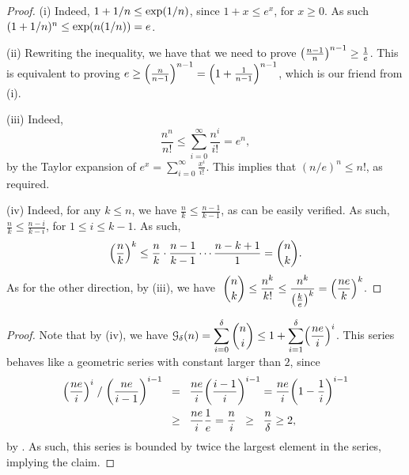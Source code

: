 \begin{proof}
    (i) Indeed, $1+1/n\leq \exp \pth{1/n}$, since $1+x \leq e^x$, for
    $x \geq 0$. As such $(1+1/n)^n \leq \exp\pth{n(1/n)} = e$.
    
    (ii) Rewriting the inequality, we have that we need to prove
    $\pth{\frac{n-1}{n}}^{n-1} \geq \frac{1}{e}$. This is equivalent
    to proving $e \geq \pth{\frac{n}{n-1}}^{n-1} = \pth{
       1+\frac{1}{n-1}}^{n-1}$, which is our friend from (i).
    
    (iii) Indeed,
    \begin{equation*}
        \frac{n^n}{n!} \leq \sum_{i=0}^{\infty} \frac{n^i}{i!} = e^n,        
    \end{equation*}
    by the Taylor expansion of $e^x = \sum_{i=0}^\infty
    \frac{x^i}{i!}$. This implies that $(n/e)^n \leq n!$, as required.
    
    (iv) Indeed, for any $k \leq n$, we have $\frac{n}{k} \leq
    \frac{n-1}{k-1}$, as can be easily verified. As such, $\frac{n}{k}
    \leq \frac{n-i}{k-i}$, for $1 \leq i \leq k-1$. As such,
    \begin{equation*}
        \pth{\frac{n}{k}}^k \leq \frac{n}{k} \cdot \frac{n-1}{k-1} \cdots
        \frac{n-k+1} {1} = \binom{n}{k}.        
    \end{equation*}
    As for the other direction, by (iii), we have $\displaystyle\;
    \binom{n}{k} \leq \frac{n^k}{k!} \leq
    \frac{n^k}{\pth{\frac{k}{e}}^{k}} = \pth{ \frac{n e}{k} }^k$.
\end{proof}

   

\begin{proof}
    Note that by  (iv), we have
    $\displaystyle \Growth{\Dim}{n} = \sum_{i=0}^{\Dim} \binom{n}{i}
    \leq 1 + \sum_{i=1}^{\Dim} \pth{\frac{ne}{i}}^i$.
    This series behaves like a geometric series with constant larger
    than $2$, since
    \begin{align*}
        {\pth{\frac{ne}{i}}^i} \;/ \; {\pth{\frac{ne}{i-1}}^{i-1}}%
        &\EQ%
        \frac{ne }{i} \pth{\frac{i-1}{i}}^{i-1} = \frac{ne }{i} \pth{1 -
           \frac{1}{i}}^{i-1}
        \\&
        \GEQ%
        \frac{ne }{i} \frac{1}{e} = \frac{n}{i}
        \GEQ%
        \frac{n}{\Dim} \geq 2,        
    \end{align*}
    by . As such, this series is bounded by
    twice the largest element in the series, implying the claim.
\end{proof}




